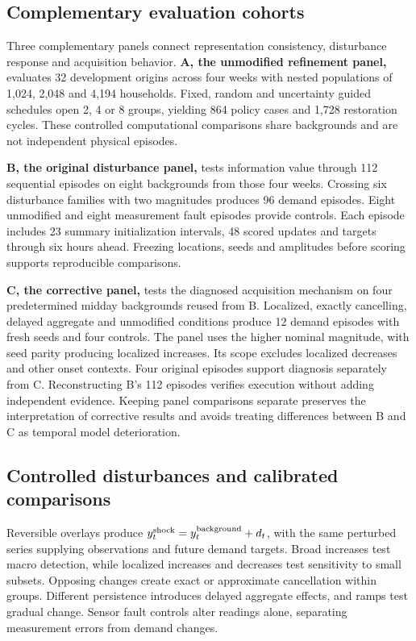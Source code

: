 \documentclass[conference]{IEEEtran}
\begin{document}
\subsection{Complementary evaluation cohorts}
Three complementary panels connect representation consistency, disturbance response and acquisition behavior. \textbf{A, the unmodified refinement panel,} evaluates 32 development origins across four weeks with nested populations of 1,024, 2,048 and 4,194 households. Fixed, random and uncertainty guided schedules open 2, 4 or 8 groups, yielding 864 policy cases and 1,728 restoration cycles. These controlled computational comparisons share backgrounds and are not independent physical episodes.

\textbf{B, the original disturbance panel,} tests information value through 112 sequential episodes on eight backgrounds from those four weeks. Crossing six disturbance families with two magnitudes produces 96 demand episodes. Eight unmodified and eight measurement fault episodes provide controls. Each episode includes 23 summary initialization intervals, 48 scored updates and targets through six hours ahead. Freezing locations, seeds and amplitudes before scoring supports reproducible comparisons.

\textbf{C, the corrective panel,} tests the diagnosed acquisition mechanism on four predetermined midday backgrounds reused from B. Localized, exactly cancelling, delayed aggregate and unmodified conditions produce 12 demand episodes with fresh seeds and four controls. The panel uses the higher nominal magnitude, with seed parity producing localized increases. Its scope excludes localized decreases and other onset contexts. Four original episodes support diagnosis separately from C. Reconstructing B's 112 episodes verifies execution without adding independent evidence. Keeping panel comparisons separate preserves the interpretation of corrective results and avoids treating differences between B and C as temporal model deterioration.




\subsection{Controlled disturbances and calibrated comparisons}
Reversible overlays produce $y^{\rm shock}_t=y^{\rm background}_t+d_t$, with the same perturbed series supplying observations and future demand targets. Broad increases test macro detection, while localized increases and decreases test sensitivity to small subsets. Opposing changes create exact or approximate cancellation within groups. Different persistence introduces delayed aggregate effects, and ramps test gradual change. Sensor fault controls alter readings alone, separating measurement errors from demand changes.
\end{document}
